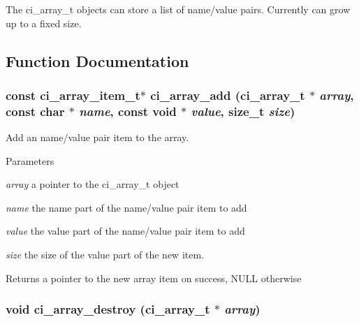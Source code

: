 The ci\_\-array\_\-t objects can store a list of name/value pairs. Currently can grow up to a fixed size. 

\subsection{Function Documentation}
\hypertarget{group__SIMPLE__ARRAYS_gae6044b8963155a903f5685c2681c2c57}{
\subsubsection[{ci\_\-array\_\-add}]{\setlength{\rightskip}{0pt plus 5cm}const ci\_\-array\_\-item\_\-t$\ast$ ci\_\-array\_\-add ({\bf ci\_\-array\_\-t} $\ast$ {\em array}, \/  const char $\ast$ {\em name}, \/  const void $\ast$ {\em value}, \/  size\_\-t {\em size})}}
\label{group__SIMPLE__ARRAYS_gae6044b8963155a903f5685c2681c2c57}


Add an name/value pair item to the array. 
\begin{DoxyParams}{Parameters}
\item[{\em array}]a pointer to the ci\_\-array\_\-t object \item[{\em name}]the name part of the name/value pair item to add \item[{\em value}]the value part of the name/value pair item to add \item[{\em size}]the size of the value part of the new item. \end{DoxyParams}
\begin{DoxyReturn}{Returns}
a pointer to the new array item on success, NULL otherwise 
\end{DoxyReturn}
\hypertarget{group__SIMPLE__ARRAYS_ga41a031d46e1c8341d0f442dfe849e29b}{
\subsubsection[{ci\_\-array\_\-destroy}]{\setlength{\rightskip}{0pt plus 5cm}void ci\_\-array\_\-destroy ({\bf ci\_\-array\_\-t} $\ast$ {\em array})}}
\label{group__SIMPLE__ARRAYS_ga41a031d46e1c8341d0f442dfe849e29b}


